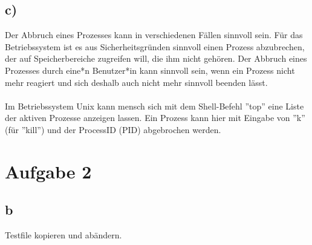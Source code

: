 \documentclass[numbers=noendperiod]{scrartcl}
\begin{document}
\subsection*{c)}
Der Abbruch eines Prozesses kann in verschiedenen Fällen sinnvoll sein. Für das Betriebssystem ist es aus Sicherheitsgründen sinnvoll einen Prozess abzubrechen, der auf Speicherbereiche zugreifen will, die ihm nicht gehören. Der Abbruch eines Prozesses durch eine*n Benutzer*in kann sinnvoll sein, wenn ein Prozess nicht mehr reagiert und sich deshalb auch nicht mehr sinnvoll beenden lässt. \\\\
Im Betriebssystem Unix kann mensch sich mit dem Shell-Befehl ''top'' eine Liste der aktiven Prozesse anzeigen lassen. Ein Prozess kann hier mit Eingabe von ''k'' (für ''kill'') und der ProcessID (PID) abgebrochen werden. 
\section{Aufgabe 2}
\subsection{b}
Testfile kopieren und abändern.
\end{document}
